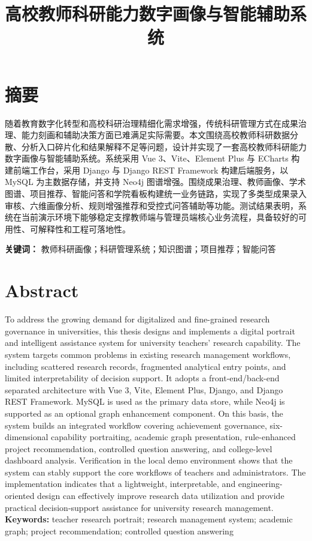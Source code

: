 \documentclass[12pt,a4paper]{ctexbook}
\title{高校教师科研能力数字画像与智能辅助系统}
\author{}
\date{}
\begin{document}
\maketitle

\chapter*{摘要}
随着教育数字化转型和高校科研治理精细化需求增强，传统科研管理方式在成果治理、能力刻画和辅助决策方面已难满足实际需要。本文围绕高校教师科研数据分散、分析入口碎片化和结果解释不足等问题，设计并实现了一套高校教师科研能力数字画像与智能辅助系统。系统采用 Vue 3、Vite、Element Plus 与 ECharts 构建前端工作台，采用 Django 与 Django REST Framework 构建后端服务，以 MySQL 为主数据存储，并支持 Neo4j 图谱增强。围绕成果治理、教师画像、学术图谱、项目推荐、智能问答和学院看板构建统一业务链路，实现了多类型成果录入审核、六维画像分析、规则增强推荐和受控式问答辅助等功能。测试结果表明，系统在当前演示环境下能够稳定支撑教师端与管理员端核心业务流程，具备较好的可用性、可解释性和工程可落地性。

\noindent\textbf{关键词：} 教师科研画像；科研管理系统；知识图谱；项目推荐；智能问答

\chapter*{Abstract}
To address the growing demand for digitalized and fine-grained research governance in universities, this thesis designs and implements a digital portrait and intelligent assistance system for university teachers' research capability. The system targets common problems in existing research management workflows, including scattered research records, fragmented analytical entry points, and limited interpretability of decision support. It adopts a front-end/back-end separated architecture with Vue 3, Vite, Element Plus, Django, and Django REST Framework. MySQL is used as the primary data store, while Neo4j is supported as an optional graph enhancement component. On this basis, the system builds an integrated workflow covering achievement governance, six-dimensional capability portraiting, academic graph presentation, rule-enhanced project recommendation, controlled question answering, and college-level dashboard analysis. Verification in the local demo environment shows that the system can stably support the core workflows of teachers and administrators. The implementation indicates that a lightweight, interpretable, and engineering-oriented design can effectively improve research data utilization and provide practical decision-support assistance for university research management.
\noindent\textbf{Keywords:} teacher research portrait; research management system; academic graph; project recommendation; controlled question answering
\end{document}
